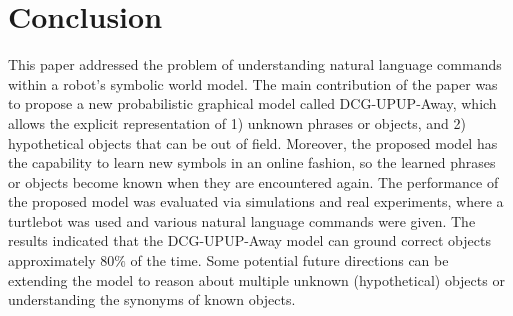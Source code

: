 \section{Conclusion}
\label{sec:conclusion}
This paper addressed the problem of understanding natural language commands within a robot's symbolic world model. The main contribution of the paper was to propose a new probabilistic graphical model called DCG-UPUP-Away, which allows the explicit representation of 1) unknown phrases or objects, and 2) hypothetical objects that can be out of field. Moreover, the proposed model has the capability to learn new symbols in an online fashion, so the learned phrases or objects become known when they are encountered again. The performance of the proposed model was evaluated via simulations and real experiments, where a turtlebot was used and various natural language commands were given. The results indicated that the DCG-UPUP-Away model can ground correct objects approximately $80\%$ of the time. Some potential future directions can be extending the model to reason about multiple unknown (hypothetical) objects or understanding the synonyms of known objects.